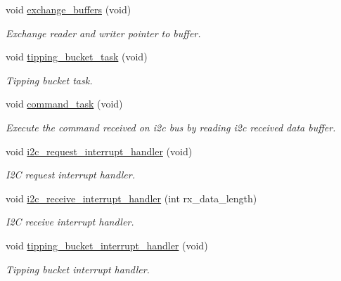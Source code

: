 \begin{DoxyCompactItemize}
void \hyperlink{i2c-rain_8h_aafa3d59a1bde3085849eee08f110612f}{exchange\+\_\+buffers} (void)
\begin{DoxyCompactList}\small\item\em Exchange reader and writer pointer to buffer. \end{DoxyCompactList}\item 
void \hyperlink{i2c-rain_8h_a8fcd3e091d63c9caff82b8bc3398c279}{tipping\+\_\+bucket\+\_\+task} (void)
\begin{DoxyCompactList}\small\item\em Tipping bucket task. \end{DoxyCompactList}\item 
void \hyperlink{i2c-rain_8h_a9f32a4169471a435e9364460d7b1761d}{command\+\_\+task} (void)
\begin{DoxyCompactList}\small\item\em Execute the command received on i2c bus by reading i2c received data buffer. \end{DoxyCompactList}\item 
void \hyperlink{i2c-rain_8h_ac1da31566bf05976ecb87372278a1ea8}{i2c\+\_\+request\+\_\+interrupt\+\_\+handler} (void)
\begin{DoxyCompactList}\small\item\em I2C request interrupt handler. \end{DoxyCompactList}\item 
void \hyperlink{i2c-rain_8h_a6e27532df66f6bf186654355def5c9af}{i2c\+\_\+receive\+\_\+interrupt\+\_\+handler} (int rx\+\_\+data\+\_\+length)
\begin{DoxyCompactList}\small\item\em I2C receive interrupt handler. \end{DoxyCompactList}\item 
void \hyperlink{i2c-rain_8h_a7fcfeb4fd75663ddccc79030c37d68b9}{tipping\+\_\+bucket\+\_\+interrupt\+\_\+handler} (void)
\begin{DoxyCompactList}\small\item\em Tipping bucket interrupt handler. \end{DoxyCompactList}\end{DoxyCompactItemize}
